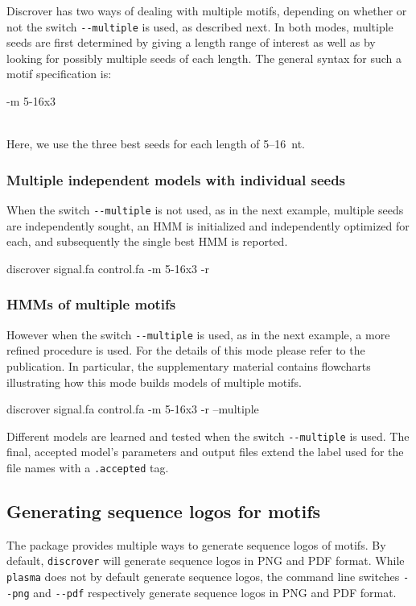 \documentclass[a4paper]{article}
\begin{document}
Discrover has two ways of dealing with multiple motifs, depending on whether or not the switch \verb|--multiple| is used, as described next.
In both modes, multiple seeds are first determined by giving a length range of interest as well as by looking for possibly multiple seeds of each length.
The general syntax for such a motif specification is:\\
\begin{verbbox}
-m 5-16x3
\end{verbbox}
\fbox{\theverbbox[t]}\\
Here, we use the three best seeds for each length of 5--16~nt.

\subsubsection{Multiple independent models with individual seeds}
When the switch \verb|--multiple| is not used, as in the next example, multiple seeds are independently sought, an HMM is initialized and independently optimized for each, and subsequently the single best HMM is reported.\\
\begin{verbbox}
discrover signal.fa control.fa -m 5-16x3 -r
\end{verbbox}
\fbox{\theverbbox[t]}

\subsubsection{HMMs of multiple motifs}
However when the switch \verb|--multiple| is used, as in the next example, a more refined procedure is used.
For the details of this mode please refer to the publication.
In particular, the supplementary material contains flowcharts illustrating how this mode builds models of multiple motifs.\\
\begin{verbbox}
discrover signal.fa control.fa -m 5-16x3 -r --multiple
\end{verbbox}
\fbox{\theverbbox[t]}

Different models are learned and tested when the switch \verb|--multiple| is used.
The final, accepted model's parameters and output files extend the label used for the file names with a \verb|.accepted| tag.

\subsection{Generating sequence logos for motifs}
The package provides multiple ways to generate sequence logos of motifs.
By default, \verb|discrover| will generate sequence logos in PNG and PDF format.
While \verb|plasma| does not by default generate sequence logos, the command line switches \verb|--png| and \verb|--pdf| respectively generate sequence logos in PNG and PDF format.
\end{document}
